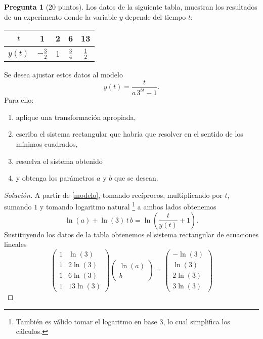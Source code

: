 \documentclass[letterpaper,12pt]{article}
\theoremstyle{definition}
\newtheorem{question}{Pregunta}
\numberwithin{equation}{question}
\newenvironment{solution}{\begin{proof}[Solución]}{\end{proof}}
\begin{document}
\newpage
\begin{question}[20 puntos]
Los datos de la siguiente tabla, muestran los resultados de un experimento donde la variable $y$ depende del tiempo $t$:
\begin{center}
\begin{tabular}{c|cccc}
$t$ & 1 & 2 & 6 & 13\\
\hline
$y(t)$ & $-\frac{3}{2}$ & 1 & $\frac{3}{4}$ & $\frac{1}{2}$
\end{tabular}
\end{center}
Se desea ajustar estos datos al modelo
%
\begin{equation}\label{modelo}
y(t)=\dfrac{t}{a \, 3^{bt}-1}.
\end{equation}
%
Para ello:
\begin{enumerate}
\setlength{\itemsep}{-1ex}
\item\label{it:transform} aplique una transformación apropiada,
\item\label{it:system} escriba el sistema rectangular que habría que resolver en el sentido de los mínimos cuadrados,
\item\label{it:solve} resuelva el sistema obtenido
\item\label{it:recover-parameters} y obtenga los parámetros $a$ y $b$ que se desean.
\end{enumerate}
\begin{solution}
A partir de \eqref{modelo}, tomando recíprocos, multiplicando por $t$, sumando $1$ y tomando logaritmo natural \footnote{Tambi\'en es v\'alido tomar el logaritmo en base 3, lo cual simplifica los c\'alculos.} a ambos lados obtenemos
%
\begin{equation*}
\ln(a) + \ln(3) \, t \, b = \ln\left(\frac{t}{y(t)} + 1\right).
\end{equation*}
%
Sustituyendo los datos de la tabla obtenemos el sistema rectangular de ecuaciones lineales
%
\begin{equation*}
\begin{pmatrix}
1 & \ln(3)\\
1 & 2\ln(3)\\
1 & 6\ln(3)\\
1 & 13\ln(3)
\end{pmatrix}
\begin{pmatrix}
\ln(a)\\ b
\end{pmatrix}
= \begin{pmatrix}
-\ln(3)\\ \ln(3) \\ 2 \ln(3) \\ 3\ln(3)

\end{pmatrix}
\end{equation*}
\end{solution}
\end{question}
\end{document}
